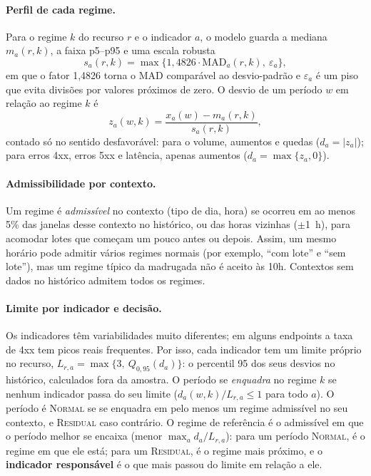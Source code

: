 \documentclass[sigconf,nonacm]{acmart}
\newcommand{\Normal}{\textsc{Normal}\xspace}
\newcommand{\Residual}{\textsc{Residual}\xspace}
\begin{document}
\paragraph{Perfil de cada regime.} Para o regime $k$ do recurso $r$ e o indicador $a$, o modelo guarda a mediana $m_a(r,k)$, a faixa p5--p95 e uma escala robusta~\citep{leys2013mad}
\begin{equation}
  s_{a}(r,k)=\max\{1{,}4826\cdot\mathrm{MAD}_{a}(r,k),\ \varepsilon_a\},
\end{equation}
em que o fator 1,4826 torna o MAD comparável ao desvio-padrão e $\varepsilon_a$ é um piso que evita divisões por valores próximos de zero. O desvio de um período $w$ em relação ao regime $k$ é
\begin{equation}
  z_a(w,k)=\frac{x_a(w)-m_a(r,k)}{s_a(r,k)},
\end{equation}
contado só no sentido desfavorável: para o volume, aumentos e quedas ($d_a=|z_a|$); para erros 4xx, erros 5xx e latência, apenas aumentos ($d_a=\max\{z_a,0\}$).

\paragraph{Admissibilidade por contexto.} Um regime é \emph{admissível} no contexto (tipo de dia, hora) se ocorreu em ao menos 5\% das janelas desse contexto no histórico, ou das horas vizinhas ($\pm$1~h), para acomodar lotes que começam um pouco antes ou depois. Assim, um mesmo horário pode admitir vários regimes normais (por exemplo, ``com lote'' e ``sem lote''), mas um regime típico da madrugada não é aceito às 10h. Contextos sem dados no histórico admitem todos os regimes.

\paragraph{Limite por indicador e decisão.} Os indicadores têm variabilidades muito diferentes; em alguns endpoints a taxa de 4xx tem picos reais frequentes. Por isso, cada indicador tem um limite próprio no recurso, $L_{r,a}=\max\{3,\ Q_{0{,}95}(d_a)\}$: o percentil 95 dos seus desvios no histórico, calculados fora da amostra. O período se \emph{enquadra} no regime $k$ se nenhum indicador passa do seu limite ($d_a(w,k)/L_{r,a}\leq 1$ para todo $a$). O período é \Normal se se enquadra em pelo menos um regime admissível no seu contexto, e \Residual caso contrário. O regime de referência é o admissível em que o período melhor se encaixa (menor $\max_a d_a/L_{r,a}$): para um período \Normal, é o regime em que ele está; para um \Residual, é o regime mais próximo, e o \textbf{indicador responsável} é o que mais passou do limite em relação a ele.
\end{document}
